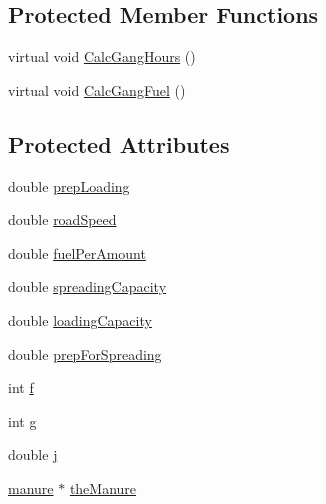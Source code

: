 \subsection*{Protected Member Functions}
\begin{DoxyCompactItemize}
\item 
virtual void \hyperlink{classanimal_fert_tech_a44124a413ec4871546323878c2782380}{CalcGangHours} ()
\item 
virtual void \hyperlink{classanimal_fert_tech_a3847a22b473b9a09f5e524c165ae0484}{CalcGangFuel} ()
\end{DoxyCompactItemize}
\subsection*{Protected Attributes}
\begin{DoxyCompactItemize}
\item 
double \hyperlink{classanimal_fert_tech_af2ca2d5414e89442073a1b46f5e315b8}{prepLoading}
\item 
double \hyperlink{classanimal_fert_tech_a146f70bdb7472097e215faba9936396f}{roadSpeed}
\item 
double \hyperlink{classanimal_fert_tech_aeb6873df46d03d1b78f31198ad4cf6a1}{fuelPerAmount}
\item 
double \hyperlink{classanimal_fert_tech_a3efcf646ccd9fa24f059889de001a400}{spreadingCapacity}
\item 
double \hyperlink{classanimal_fert_tech_a8c42f4fcb4633c38d43c367b09ee1fbd}{loadingCapacity}
\item 
double \hyperlink{classanimal_fert_tech_affe6aa2c2c0e08887a1b3f5b8690cd69}{prepForSpreading}
\item 
int \hyperlink{classanimal_fert_tech_a6692fe2b1bb0935b3eab56dc38f69963}{f}
\item 
int \hyperlink{classanimal_fert_tech_acebfd541ba0220e8aa692defae5d2445}{g}
\item 
double \hyperlink{classanimal_fert_tech_a5b982f4c6c23715c6dc580c6b3f6c69e}{j}
\item 
\hyperlink{classmanure}{manure} $\ast$ \hyperlink{classanimal_fert_tech_ac0b8fa8db716140c87f147dbd65bca53}{theManure}
\end{DoxyCompactItemize}


